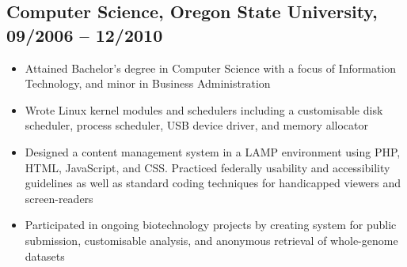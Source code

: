 \documentclass[a4paper,12pt]{report}
\begin{document}
\subsection*{Computer Science, Oregon State University, 09/2006 -- 12/2010}
\begin{itemize} \itemsep -0.25em
\item Attained Bachelor’s degree in Computer Science with a focus of Information Technology, and minor in Business Administration
\item Wrote Linux kernel modules and schedulers including a customisable disk scheduler, process scheduler, USB device driver, and memory allocator
\item Designed a content management system in a LAMP environment using PHP, HTML, JavaScript, and CSS. Practiced federally usability and accessibility guidelines as well as standard coding techniques for handicapped viewers and screen-readers
\item Participated in ongoing biotechnology projects by creating system for public submission, customisable analysis, and anonymous retrieval of whole-genome datasets

\end{itemize}
\end{document}
